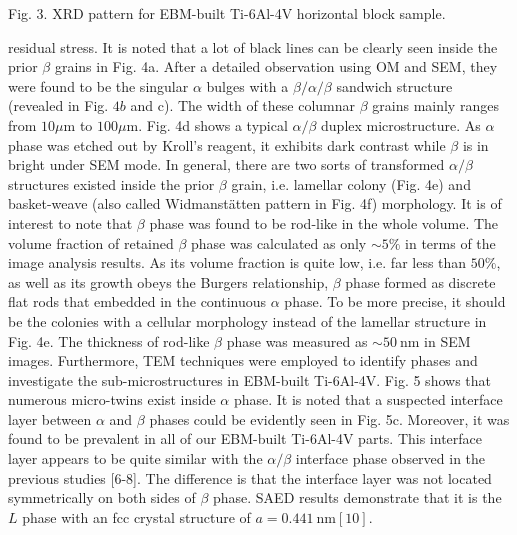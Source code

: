 \documentclass[10pt]{article}
\begin{document}
Fig. 3. XRD pattern for EBM-built Ti-6Al-4V horizontal block sample.

residual stress. It is noted that a lot of black lines can be clearly seen inside the prior $\beta$ grains in Fig. 4a. After a detailed observation using OM and SEM, they were found to be the singular $\alpha$ bulges with a $\beta / \alpha / \beta$ sandwich structure (revealed in Fig. $4 b$ and c). The width of these columnar $\beta$ grains mainly ranges from $10 \mu \mathrm{m}$ to $100 \mu \mathrm{m}$. Fig. 4d shows a typical $\alpha / \beta$ duplex microstructure. As $\alpha$ phase was etched out by Kroll's reagent, it exhibits dark contrast while $\beta$ is in bright under SEM mode. In general, there are two sorts of transformed $\alpha / \beta$ structures existed inside the prior $\beta$ grain, i.e. lamellar colony (Fig. 4e) and basket-weave (also called Widmanstätten pattern in Fig. 4f) morphology. It is of interest to note that $\beta$ phase was found to be rod-like in the whole volume. The volume fraction of retained $\beta$ phase was calculated as only $\sim 5 \%$ in terms of the image analysis results. As its volume fraction is quite low, i.e. far less than $50 \%$, as well as its growth obeys the Burgers relationship, $\beta$ phase formed as discrete flat rods that embedded in the continuous $\alpha$ phase. To be more precise, it should be the colonies with a cellular morphology instead of the lamellar structure in Fig. 4e. The thickness of rod-like $\beta$ phase was measured as $\sim 50 \mathrm{~nm}$ in SEM images. Furthermore, TEM techniques were employed to identify phases and investigate the sub-microstructures in EBM-built Ti-6Al-4V. Fig. 5 shows that numerous micro-twins exist inside $\alpha$ phase. It is noted that a suspected interface layer between $\alpha$ and $\beta$ phases could be evidently seen in Fig. 5c. Moreover, it was found to be prevalent in all of our EBM-built Ti-6Al-4V parts. This interface layer appears to be quite similar with the $\alpha / \beta$ interface phase observed in the previous studies [6-8]. The difference is that the interface layer was not located symmetrically on both sides of $\beta$ phase. SAED results demonstrate that it is the $L$ phase with an fcc crystal structure of $a=0.441 \mathrm{~nm}[10]$.
\end{document}
